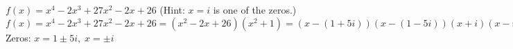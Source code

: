 {$f(x) = x^{4} - 2x^{3} + 27x^{2} - 2x + 26$ (Hint: $x = i$ is one of the zeros.)}
{$f(x) = x^{4} - 2x^{3} + 27x^{2} - 2x + 26 = (x^{2} - 2x + 26)(x^{2} + 1) = (x - (1 + 5i))(x - (1 - 5i))(x + i)(x - i)$\\ 
Zeros: $x = 1 \pm 5i, \; x = \pm i$}